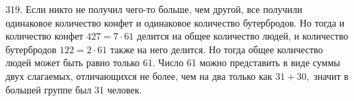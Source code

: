319. Если никто не получил чего-то больше, чем другой, все получили одинаковое количество конфет и одинаковое количество бутербродов. Но тогда и количество конфет $427=7\cdot61$ делится на общее количество людей, и количество бутербродов $122=2\cdot61$ также на него делится. Но тогда общее количество людей может быть равно только 61.  Число 61 можно представить в виде суммы двух слагаемых, отличающихся не более, чем на два только как $31+30,$ значит в большей группе был 31 человек.\\
